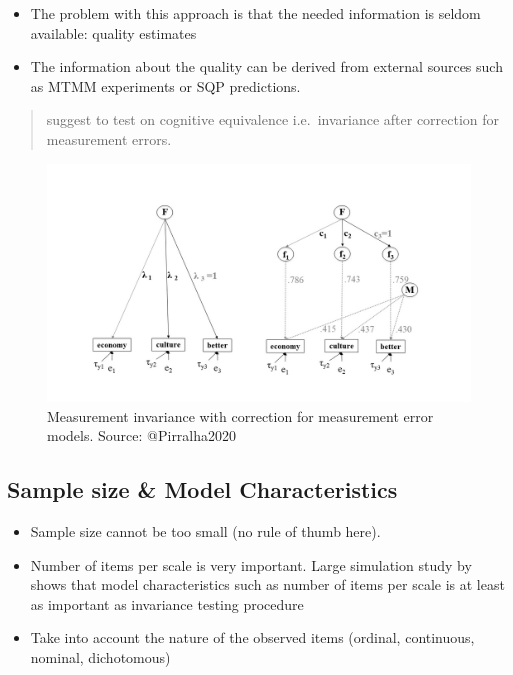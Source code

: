 \documentclass[
]{book}
\begin{document}
\begin{itemize}
\item
  The problem with this approach is that the needed information is seldom available: quality estimates
\item
  The information about the quality can be derived from external sources such as MTMM experiments or SQP predictions.
\end{itemize}

\begin{quote}
\citet{Pirralha2020} suggest to test on cognitive equivalence i.e.~invariance after correction for measurement errors.
\end{quote}

\begin{figure}
\includegraphics[width=0.8\linewidth]{correctionmodel} \caption{Measurement invariance with correction for measurement error models. Source: @Pirralha2020}\label{fig:correction}
\end{figure}

\hypertarget{sample-size-model-characteristics}{%
\subsection{Sample size \& Model Characteristics}\label{sample-size-model-characteristics}}

\begin{itemize}
\item
  Sample size cannot be too small (no rule of thumb here).
\item
  Number of items per scale is very important. Large simulation study by \citet{Pokropek2019} shows that model characteristics such as number of items per scale is at least as important as invariance testing procedure
\item
  Take into account the nature of the observed items (ordinal, continuous, nominal, dichotomous)
\end{itemize}
\end{document}
